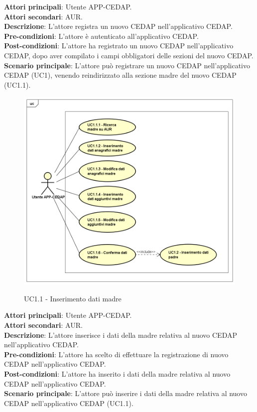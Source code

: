 \documentclass[a4paper]{article}
\newcounter{subsubsubsection}[subsubsection]
\begin{document}
\textbf{Attori principali}: Utente APP-CEDAP.
\\
\textbf{Attori secondari}: AUR.
\\
\textbf{Descrizione}: L'attore registra un nuovo CEDAP nell'applicativo CEDAP.
\\
\textbf{Pre-condizioni}: L'attore è autenticato all'applicativo CEDAP.
\\
\textbf{Post-condizioni}: L'attore ha registrato un nuovo CEDAP nell'applicativo CEDAP, dopo aver compilato i campi obbligatori delle sezioni del nuovo CEDAP.
\\
\textbf{Scenario principale}: L'attore può registrare un nuovo CEDAP nell'applicativo CEDAP (UC1), venendo reindirizzato alla sezione madre del nuovo CEDAP (UC1.1).

\begin{figure}[H]
	\centering
	\includegraphics[width=\linewidth]{uml/UC1_1.png}
    \label{fig:UC1.1}
	\caption{UC1.1 - Inserimento dati madre}
\end{figure}

\label{UC1.1}

\textbf{Attori principali}: Utente APP-CEDAP.
\\
\textbf{Attori secondari}: AUR.
\\
\textbf{Descrizione}: L'attore inserisce i dati della madre relativa al nuovo CEDAP nell'applicativo CEDAP.
\\
\textbf{Pre-condizioni}: L'attore ha scelto di effettuare la registrazione di nuovo CEDAP nell'applicativo CEDAP.
\\
\textbf{Post-condizioni}: L'attore ha inserito i dati della madre relativa al nuovo CEDAP nell'applicativo CEDAP.
\\
\textbf{Scenario principale}: L'attore può inserire i dati della madre relativa al nuovo CEDAP nell'applicativo CEDAP (UC1.1).
\end{document}
